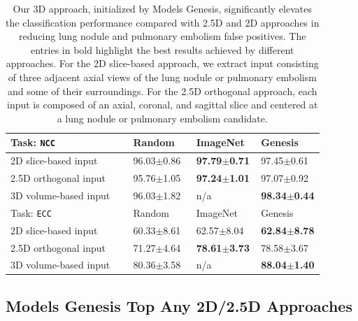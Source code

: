 \begin{table}[t]
\centering
\footnotesize
\caption[Models Genesis Top Any 2D/2.5D Approaches]{
Our 3D approach, initialized by Models Genesis, significantly elevates the classification performance compared with 2.5D and 2D approaches in reducing lung nodule and pulmonary embolism false positives. The entries in bold highlight the best results achieved by different approaches. For the 2D slice-based approach, we extract input consisting of three adjacent axial views of the lung nodule or pulmonary embolism and some of their surroundings. For the 2.5D orthogonal approach, each input is composed of an axial, coronal, and sagittal slice and centered at a lung nodule or pulmonary embolism candidate.
}
\label{ch5:tab:3d_2.5d_2d}
\begin{tabular}{p{0.35\linewidth}P{0.18\linewidth}P{0.18\linewidth}P{0.18\linewidth}}
    \hline
    Task: \texttt{NCC} & Random & ImageNet & Genesis \\
    \hline
    2D slice-based input & 96.03$\pm$0.86 & \textbf{97.79$\pm$0.71} & 97.45$\pm$0.61 \\
    2.5D orthogonal input & 95.76$\pm$1.05 & \textbf{97.24$\pm$1.01} & 97.07$\pm$0.92 \\
    3D volume-based input & 96.03$\pm$1.82 & n/a & \textbf{98.34$\pm$0.44} \\
    \hline
    \hline
    Task: \texttt{ECC} & Random & ImageNet & Genesis \\
    \hline
    2D slice-based input & 60.33$\pm$8.61 & 62.57$\pm$8.04 & \textbf{62.84$\pm$8.78} \\
    2.5D orthogonal input & 71.27$\pm$4.64 & \textbf{78.61$\pm$3.73} & 78.58$\pm$3.67 \\
    3D volume-based input & 80.36$\pm$3.58 & n/a & \textbf{88.04$\pm$1.40} \\
    \hline
    \end{tabular}
\end{table}

\subsection{Models Genesis Top Any 2D/2.5D Approaches}
\label{ch5:models_genesis_top_2D}

